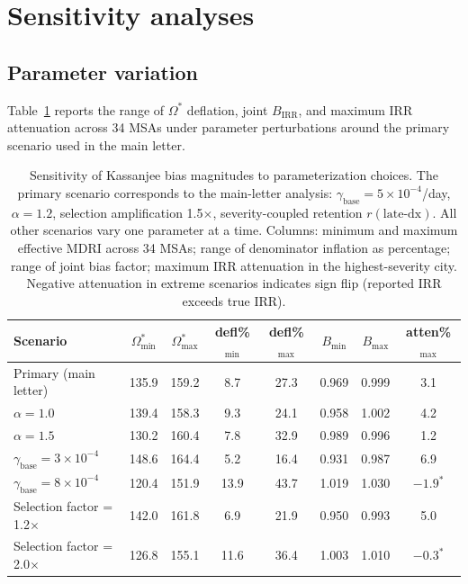 \documentclass[11pt]{article}
\begin{document}
\section{Sensitivity analyses}

\subsection{Parameter variation}

Table~\ref{tab:sensitivity} reports the range of $\Omega^*$ deflation, joint $B_{\mathrm{IRR}}$, and maximum IRR attenuation across 34 MSAs under parameter perturbations around the primary scenario used in the main letter.

\begin{table}[H]
\centering
\small
\caption{Sensitivity of Kassanjee bias magnitudes to parameterization choices. The primary scenario corresponds to the main-letter analysis: $\gamma_{\mathrm{base}} = 5\times10^{-4}$/day, $\alpha = 1.2$, selection amplification 1.5$\times$, severity-coupled retention $r(\text{late-dx})$. All other scenarios vary one parameter at a time. Columns: minimum and maximum effective MDRI across 34 MSAs; range of denominator inflation as percentage; range of joint bias factor; maximum IRR attenuation in the highest-severity city. Negative attenuation in extreme scenarios indicates sign flip (reported IRR exceeds true IRR).}
\label{tab:sensitivity}
\begin{tabular}{lccccccc}
\toprule
Scenario & $\Omega^*_{\min}$ & $\Omega^*_{\max}$ & defl\%$_{\min}$ & defl\%$_{\max}$ & $B_{\min}$ & $B_{\max}$ & atten\%$_{\max}$ \\
\midrule
Primary (main letter)          & 135.9 & 159.2 & 8.7  & 27.3 & 0.969 & 0.999 & 3.1 \\
\midrule
$\alpha = 1.0$                 & 139.4 & 158.3 & 9.3  & 24.1 & 0.958 & 1.002 & 4.2 \\
$\alpha = 1.5$                 & 130.2 & 160.4 & 7.8  & 32.9 & 0.989 & 0.996 & 1.2 \\
$\gamma_{\mathrm{base}} = 3\times10^{-4}$ & 148.6 & 164.4 & 5.2  & 16.4 & 0.931 & 0.987 & 6.9 \\
$\gamma_{\mathrm{base}} = 8\times10^{-4}$ & 120.4 & 151.9 & 13.9 & 43.7 & 1.019 & 1.030 & $-1.9^*$ \\
Selection factor = 1.2$\times$ & 142.0 & 161.8 & 6.9  & 21.9 & 0.950 & 0.993 & 5.0 \\
Selection factor = 2.0$\times$ & 126.8 & 155.1 & 11.6 & 36.4 & 1.003 & 1.010 & $-0.3^*$ \\

\end{tabular}
\end{table}
\end{document}
